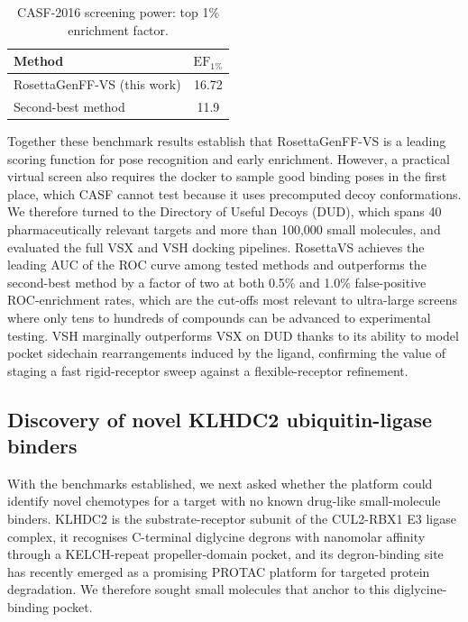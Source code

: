 \documentclass[11pt]{article}
\begin{document}
\begin{table}[htbp]
\centering
\caption{CASF-2016 screening power: top 1\% enrichment factor.}
\label{tab:casf_screening}
\begin{tabular}{lc}
\toprule
Method & $\mathrm{EF}_{1\%}$ \\
\midrule
RosettaGenFF-VS (this work) & 16.72 \\
Second-best method & 11.9 \\
\bottomrule
\end{tabular}
\end{table}

Together these benchmark results establish that RosettaGenFF-VS is a
leading scoring function for pose recognition and early enrichment.
However, a practical virtual screen also requires the docker to sample
good binding poses in the first place, which CASF cannot test because it
uses precomputed decoy conformations. We therefore turned to the
Directory of Useful Decoys (DUD), which spans 40 pharmaceutically
relevant targets and more than 100{,}000 small molecules, and evaluated
the full VSX and VSH docking pipelines. RosettaVS achieves the leading
AUC of the ROC curve among tested methods and outperforms the second-best
method by a factor of two at both 0.5\% and 1.0\% false-positive
ROC-enrichment rates, which are the cut-offs most relevant to ultra-large
screens where only tens to hundreds of compounds can be advanced to
experimental testing. VSH marginally outperforms VSX on DUD thanks to
its ability to model pocket sidechain rearrangements induced by the
ligand, confirming the value of staging a fast rigid-receptor sweep
against a flexible-receptor refinement.

\subsection{Discovery of novel KLHDC2 ubiquitin-ligase binders}

With the benchmarks established, we next asked whether the platform could
identify novel chemotypes for a target with no known drug-like
small-molecule binders. KLHDC2 is the substrate-receptor subunit of the
CUL2-RBX1 E3 ligase complex, it recognises C-terminal diglycine degrons
with nanomolar affinity through a KELCH-repeat propeller-domain pocket,
and its degron-binding site has recently emerged as a promising PROTAC
platform for targeted protein degradation. We therefore sought small
molecules that anchor to this diglycine-binding pocket.
\end{document}
